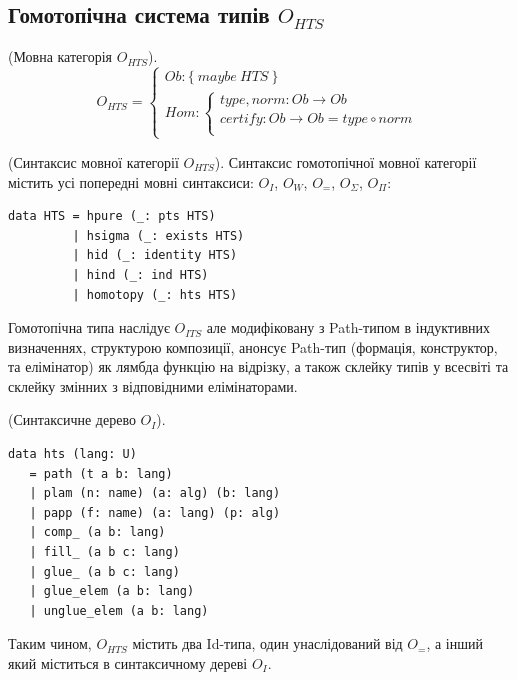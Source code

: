 \newpage
\subsection{Гомотопічна система типів $O_{HTS}$}

\begin{definition} (Мовна категорія $O_{HTS}$).
$$
O_{HTS} =
\begin{cases}
Ob: \{\ maybe\ HTS\ \} \\
Hom: \begin{cases}
type,norm: Ob \rightarrow Ob \\
certify: Ob \rightarrow Ob = type \circ norm \\
\end{cases}
\end{cases}
$$
\end{definition}

\begin{definition} (Синтаксис мовної категорії $O_{HTS}$).
Синтаксис гомотопічної мовної категорії містить усі
попередні мовні синтаксиси: $O_I$, $O_W$, $O_=$, $O_\Sigma$, $O_\Pi$:
\begin{lstlisting}
data HTS = hpure (_: pts HTS)
         | hsigma (_: exists HTS)
         | hid (_: identity HTS)
         | hind (_: ind HTS)
         | homotopy (_: hts HTS)
\end{lstlisting}
\end{definition}

Гомотопічна типа наслідує $O_{ITS}$ але модифіковану з
Path-типом в індуктивних визначеннях, структурою композиції,
анонсує Path-тип (формація, конструктор, та елімінатор)
як лямбда функцію на відрізку, а також склейку типів у всесвіті
та склейку змінних з відповідними елімінаторами.

\begin{definition} (Синтаксичне дерево $O_I$).
\begin{lstlisting}
data hts (lang: U)
   = path (t a b: lang)
   | plam (n: name) (a: alg) (b: lang)
   | papp (f: name) (a: lang) (p: alg)
   | comp_ (a b: lang)
   | fill_ (a b c: lang)
   | glue_ (a b c: lang)
   | glue_elem (a b: lang)
   | unglue_elem (a b: lang)
\end{lstlisting}
\end{definition}

Таким чином,
$O_{HTS}$ містить два Id-типа, один унаслідований від $O_=$,
а інший який міститься в синтаксичному дереві $O_I$.

\newpage

